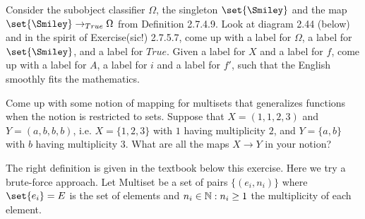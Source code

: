 \documentclass{article}
\begin{document}

Consider the subobject classifier $\Omega$, the singleton $\set{\Smiley}$ and
the map $\set{\Smiley} \to_{True} \Omega$ from Definition 2.7.4.9. Look at
diagram 2.44 (below) and in the spirit of Exercise(sic!) 2.7.5.7, come up with a
label for $\Omega$, a label for $\set{\Smiley}$, and a label for $True$. Given a
label for $X$ and a label for $f$, come up with a label for $A$, a label for $i$
and a label for $f'$, such that the English smoothly fits the mathematics.


\begin{center}
\end{center}

\ans


\begin{center}
\end{center}


\es Come up with some notion of mapping for multisets that generalizes functions
    when the notion is restricted to sets.
\ei Suppose that $X = (1, 1, 2, 3)$ and $Y = (a, b, b, b)$, i.e. $X = \{1, 2,
    3\}$ with $1$ having multiplicity $2$, and $Y = \{a, b\}$ with $b$ having
    multiplicity $3$. What are all the maps $X \to Y$ in your notion?
\ee

\ans

\es The right definition is given in the textbook below this exercise. Here we
    try a brute-force approach. Let Multiset be a set of pairs $\{(e_i,n_i)\}$
    where $\set{e_i} = E$ is the set of elements and $n_i \in \mathbb{N} : n_i \ge 1$
    the multiplicity of each element.
\end{document}
